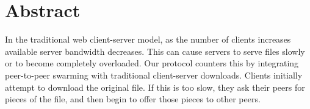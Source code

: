 \section {Abstract}
In the traditional web client-server model, as the number of clients increases available server bandwidth decreases.  This can cause servers to serve files slowly or to become completely overloaded.  Our protocol counters this by integrating peer-to-peer swarming with traditional client-server downloads.  Clients initially attempt to download the original file.  If this is too slow, they ask their peers for pieces of the file, and then begin to offer those pieces to other peers.
